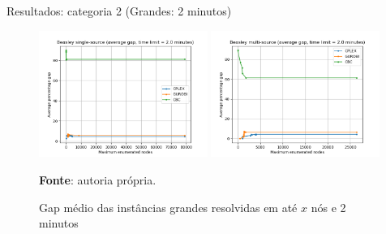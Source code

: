 \documentclass[aspectratio=169]{beamer}
\begin{document}
	\begin{frame}{Resultados: categoria 2 (Grandes: 2 minutos)} %
		
		\begin{figure}[H]
			\begin{center}
				\caption{Gap médio das instâncias grandes resolvidas em até $x$ nós e 2 minutos \cite{Beasley}}
				
				\includegraphics[width=0.49\textwidth]{res/Beasley SS large 120 - Average gap x Nodes.png}
				\includegraphics[width=0.49\textwidth]{res/Beasley MS large 120 - Average gap x Nodes.png}				
				\label{Gap:n:Beasley:120}
				
				\textbf{Fonte}: autoria própria.
			\end{center}
		\end{figure}
		
	\end{frame}
\end{document}
